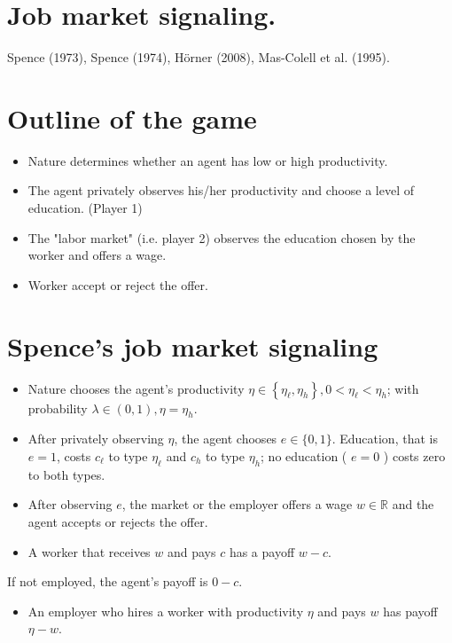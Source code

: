 \documentclass[10pt]{article}
\begin{document}
\section*{Job market signaling.}
Spence (1973), Spence (1974), Hörner (2008), Mas-Colell et al. (1995).

\section*{Outline of the game}
\begin{itemize}
  \item Nature determines whether an agent has low or high productivity.
  \item The agent privately observes his/her productivity and choose a level of education. (Player 1)
  \item The "labor market" (i.e. player 2) observes the education chosen by the worker and offers a wage.
  \item Worker accept or reject the offer.
\end{itemize}

\section*{Spence's job market signaling}
\begin{itemize}
  \item Nature chooses the agent's productivity $\eta \in\left\{\eta_{\ell}, \eta_{h}\right\}, 0<\eta_{\ell}<\eta_{h}$; with probability $\lambda \in(0,1), \eta=\eta_{h}$.
  \item After privately observing $\eta$, the agent chooses $e \in\{0,1\}$. Education, that is $e=1$, costs $c_{\ell}$ to type $\eta_{\ell}$ and $c_{h}$ to type $\eta_{h}$; no education ( $e=0$ ) costs zero to both types.
  \item After observing $e$, the market or the employer offers a wage $w \in \mathbb{R}$ and the agent accepts or rejects the offer.
  \item A worker that receives $w$ and pays $c$ has a payoff $w-c$.
\end{itemize}

If not employed, the agent's payoff is $0-c$.

\begin{itemize}
  \item An employer who hires a worker with productivity $\eta$ and pays $w$ has payoff $\eta-w$.
\end{itemize}
\end{document}
